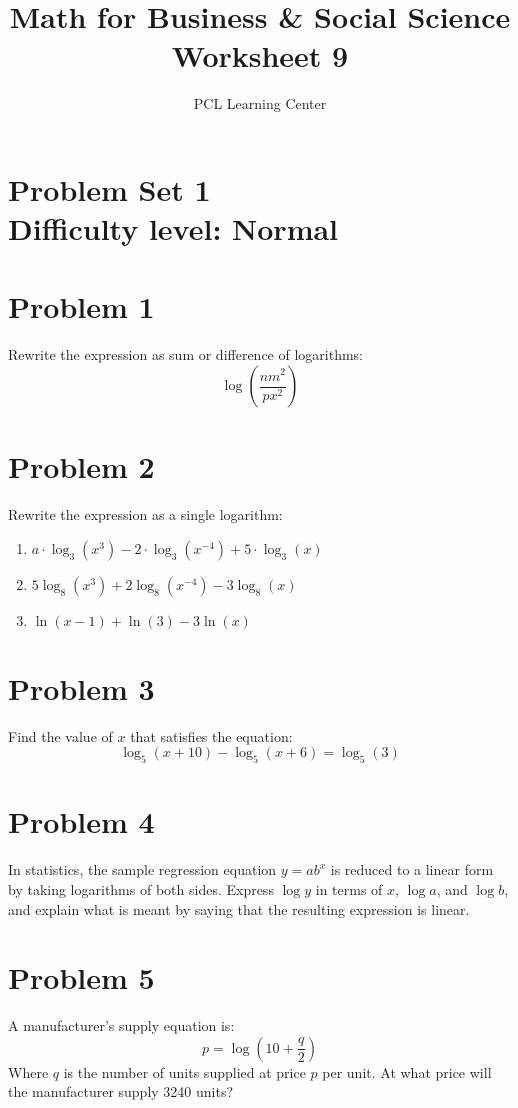 \documentclass[12pt]{article}
\title{Math for Business \& Social Science\\ Worksheet 9}
\author{PCL Learning Center}
\date{}
\begin{document}
\maketitle

\section*{Problem Set 1\\Difficulty level: Normal}
\section*{Problem 1}
Rewrite the expression as sum or difference of logarithms: 
\[
\log\left(\frac{nm^2}{px^2}\right)
\]

\section*{Problem 2}
Rewrite the expression as a single logarithm:
\begin{enumerate}[label=(\alph*)]
    \item \( a \cdot \log_3(x^3) - 2 \cdot \log_3(x^{-4}) + 5 \cdot \log_3(x) \)
    \item \( 5\log_8(x^3) + 2\log_8(x^{-4}) - 3\log_8(x) \)
    \item \( \ln(x - 1) + \ln(3) - 3\ln(x) \)
\end{enumerate}

\section*{Problem 3}
Find the value of \( x \) that satisfies the equation:
\[
\log_5(x + 10) - \log_5(x + 6) = \log_5(3)
\]

\section*{Problem 4}
In statistics, the sample regression equation \( y = ab^x \) is reduced to a linear form by taking logarithms of both sides. Express \( \log y \) in terms of \( x \), \( \log a \), and \( \log b \), and explain what is meant by saying that the resulting expression is linear.

\section*{Problem 5}
A manufacturer’s supply equation is:
\[
p = \log\left(10 + \frac{q}{2} \right)
\]
Where \( q \) is the number of units supplied at price \( p \) per unit. At what price will the manufacturer supply 3240 units?
\end{document}

